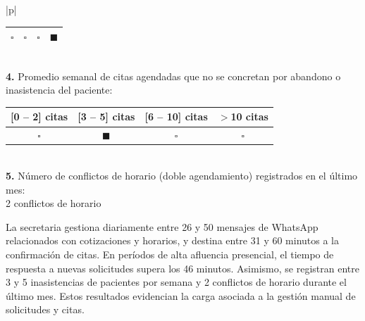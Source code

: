 {\begin{longtable}{|p{\dimexpr{}\arrayrulewidth\relax}|}
\begin{tabular}{|c|c|c|c|}
$\square$ & $\square$ & $\square$ & $\blacksquare$ \\ \hline
\end{tabular} \\
\hline
\textbf{4.} Promedio semanal de citas agendadas que no se concretan por abandono o inasistencia del paciente: \\[2pt]
\begin{tabular}{|c|c|c|c|}
\hline
\textbf{[0 -- 2] citas} & \textbf{[3 -- 5] citas} & \textbf{[6 -- 10] citas} & \textbf{$>$10 citas} \\ \hline
$\square$ & $\blacksquare$ & $\square$ & $\square$ \\ \hline
\end{tabular} \\
\hline
\textbf{5.} Número de conflictos de horario (doble agendamiento) registrados en el último mes: \\[2pt]
2 conflictos de horario \\
\hline
\end{longtable}}

\medskip

La secretaria gestiona diariamente entre 26 y 50 mensajes de WhatsApp relacionados con cotizaciones y horarios, y destina entre 31 y 60 minutos a la confirmación de citas. En períodos de alta afluencia presencial, el tiempo de respuesta a nuevas solicitudes supera los 46 minutos. Asimismo, se registran entre 3 y 5 inasistencias de pacientes por semana y 2 conflictos de horario durante el último mes. Estos resultados evidencian la carga asociada a la gestión manual de solicitudes y citas.